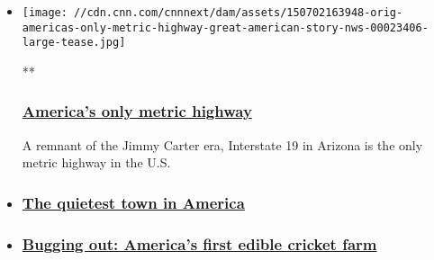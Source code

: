 \begin{itemize}
\item
  \href{/videos/living/2015/07/02/orig-americas-only-metric-highway-great-american-story-nws.cnn}{}

  \texttt{[image: //cdn.cnn.com/cnnnext/dam/assets/150702163948-orig-americas-only-metric-highway-great-american-story-nws-00023406-large-tease.jpg]}

  **

  \hypertarget{americas-only-metric-highway}{%
  \subsubsection{\texorpdfstring{\href{/videos/living/2015/07/02/orig-americas-only-metric-highway-great-american-story-nws.cnn}{America's
  only metric
  highway}}{America's only metric highway}}\label{americas-only-metric-highway}}

  A remnant of the Jimmy Carter era, Interstate 19 in Arizona is the
  only metric highway in the U.S.
\item
  \hypertarget{the-quietest-town-in-america}{%
  \subsubsection{\texorpdfstring{\href{/videos/us/2015/07/03/orig-quietest-town-in-america-green-bank-west-virginia-great-american-stories.cnn}{The
  quietest town in
  America}}{The quietest town in America}}\label{the-quietest-town-in-america}}
\item
  \hypertarget{bugging-out-americas-first-edible-cricket-farm}{%
  \subsubsection{\texorpdfstring{\href{/videos/us/2015/09/10/orig-first-edible-urban-cricket-farm-youngstown-ohio-great-american-stories-crane.cnn}{Bugging
  out: America's first edible cricket
  farm}}{Bugging out: America's first edible cricket farm}}\label{bugging-out-americas-first-edible-cricket-farm}}
\end{itemize}

